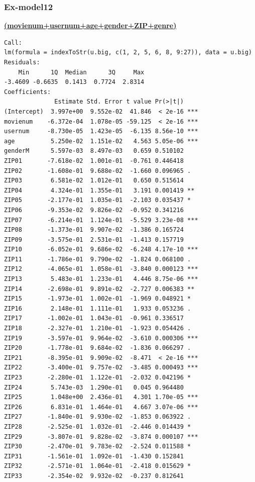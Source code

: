 \documentclass[11pt]{article}
\begin{document}
\subsubsection{Ex-model12}
\textbf{\underline{(movienum+usernum+age+gender+ZIP+genre)}}
\begin{verbatim}
Call:
lm(formula = indexToStr(u.big, c(1, 2, 5, 6, 8, 9:27)), data = u.big)
Residuals:
    Min      1Q  Median      3Q     Max 
-3.4609 -0.6635  0.1413  0.7724  2.8314 
Coefficients:
              Estimate Std. Error t value Pr(>|t|)    
(Intercept)  3.997e+00  9.552e-02  41.846  < 2e-16 ***
movienum    -6.372e-04  1.078e-05 -59.125  < 2e-16 ***
usernum     -8.730e-05  1.423e-05  -6.135 8.56e-10 ***
age          5.250e-02  1.151e-02   4.563 5.05e-06 ***
genderM      5.597e-03  8.497e-03   0.659 0.510102    
ZIP01       -7.618e-02  1.001e-01  -0.761 0.446418    
ZIP02       -1.608e-01  9.688e-02  -1.660 0.096965 .  
ZIP03        6.581e-02  1.012e-01   0.650 0.515614    
ZIP04        4.324e-01  1.355e-01   3.191 0.001419 **
ZIP05       -2.177e-01  1.035e-01  -2.103 0.035437 *  
ZIP06       -9.353e-02  9.826e-02  -0.952 0.341216    
ZIP07       -6.214e-01  1.124e-01  -5.529 3.23e-08 ***
ZIP08       -1.373e-01  9.907e-02  -1.386 0.165724    
ZIP09       -3.575e-01  2.531e-01  -1.413 0.157719
ZIP10       -6.052e-01  9.686e-02  -6.248 4.17e-10 ***
ZIP11       -1.786e-01  9.790e-02  -1.824 0.068100 .  
ZIP12       -4.065e-01  1.058e-01  -3.840 0.000123 ***
ZIP13        5.483e-01  1.233e-01   4.446 8.75e-06 ***
ZIP14       -2.698e-01  9.891e-02  -2.727 0.006383 ** 
ZIP15       -1.973e-01  1.002e-01  -1.969 0.048921 *  
ZIP16        2.148e-01  1.111e-01   1.933 0.053236 .  
ZIP17       -1.002e-01  1.043e-01  -0.961 0.336517    
ZIP18       -2.327e-01  1.210e-01  -1.923 0.054426 .  
ZIP19       -3.597e-01  9.964e-02  -3.610 0.000306 ***
ZIP20       -1.778e-01  9.684e-02  -1.836 0.066297 .  
ZIP21       -8.395e-01  9.909e-02  -8.471  < 2e-16 ***
ZIP22       -3.400e-01  9.757e-02  -3.485 0.000493 ***
ZIP23       -2.280e-01  1.122e-01  -2.032 0.042196 *  
ZIP24        5.743e-03  1.290e-01   0.045 0.964480    
ZIP25        1.048e+00  2.436e-01   4.301 1.70e-05 ***
ZIP26        6.831e-01  1.464e-01   4.667 3.07e-06 ***
ZIP27       -1.840e-01  9.930e-02  -1.853 0.063922 .  
ZIP28       -2.525e-01  1.032e-01  -2.446 0.014439 *  
ZIP29       -3.807e-01  9.828e-02  -3.874 0.000107 ***
ZIP30       -2.470e-01  9.783e-02  -2.524 0.011588 *  
ZIP31       -1.561e-01  1.092e-01  -1.430 0.152841    
ZIP32       -2.571e-01  1.064e-01  -2.418 0.015629 *  
ZIP33       -2.354e-02  9.932e-02  -0.237 0.812641    

\end{verbatim}
\end{document}
